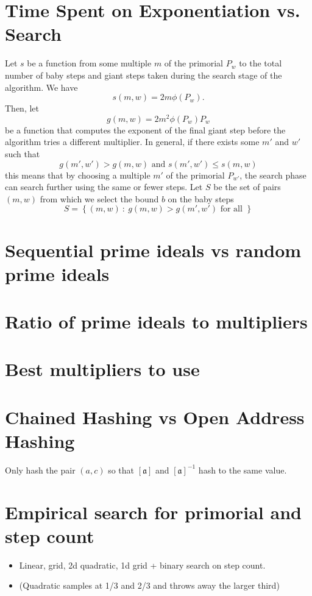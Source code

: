 \documentclass{ucalgthes1}
\theoremstyle{definition}
\newcommand{\aclass}{[\mathfrak a]}
\begin{document}
\section{Time Spent on Exponentiation vs. Search}
\label{sec:ssparExpVsSearch}

Let $s$ be a function from some multiple $m$ of the primorial $P_w$ to the total number of baby steps and giant steps taken during the search stage of the algorithm.  We have
\[
	s(m, w) = 2 m \phi(P_w).
\]
Then, let
\[
	g(m, w) = 2 m^2 \phi(P_w) P_w
\]
be a function that computes the exponent of the final giant step before the algorithm tries a different multiplier.  In general, if there exists some $m'$ and $w'$ such that 
\[
g(m', w') > g(m, w) \textrm{ and } s(m', w') \le s(m, w)
\]
this means that by choosing a multiple $m'$ of the primorial $P_{w'}$, the search phase can search further using the same or fewer steps.  Let $S$ be the set of pairs $(m, w)$ from which we select the bound $b$ on the baby steps
\[
  S = \left\{ (m, w) ~:~ g(m, w) > g(m', w') \textrm{ for all }  \right\}
\]


\section{Sequential prime ideals vs random prime ideals}

\section{Ratio of prime ideals to multipliers}
\label{sec:ssparIdealsToMultipliers}

\section{Best multipliers to use}

\section{Chained Hashing vs Open Address Hashing}

Only hash the pair $(a,c)$ so that $\aclass$ and $\aclass^{-1}$ hash to the same value.

\section{Empirical search for primorial and step count}
\begin{itemize}
\item Linear, grid, 2d quadratic, 1d grid + binary search on step count.
\item (Quadratic samples at 1/3 and 2/3 and throws away the larger third)
\end{itemize}
\end{document}
